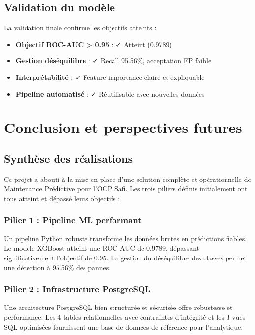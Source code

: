 \documentclass[a4paper,12pt,twoside]{report}
\begin{document}
\section{Validation du modèle}

La validation finale confirme les objectifs atteints :

\begin{itemize}
    \item \textbf{Objectif ROC-AUC > 0.95} : ✓ Atteint (0.9789)
    \item \textbf{Gestion déséquilibre} : ✓ Recall 95.56\%, acceptation FP faible
    \item \textbf{Interprétabilité} : ✓ Feature importance claire et expliquable
    \item \textbf{Pipeline automatisé} : ✓ Réutilisable avec nouvelles données
\end{itemize}

\chapter{Conclusion et perspectives futures}

\section{Synthèse des réalisations}

Ce projet a abouti à la mise en place d'une solution complète et opérationnelle de Maintenance Prédictive pour l'OCP Safi. Les trois piliers définis initialement ont tous atteint et dépassé leurs objectifs :

\subsection{Pilier 1 : Pipeline ML performant}

Un pipeline Python robuste transforme les données brutes en prédictions fiables. Le modèle XGBoost atteint une ROC-AUC de 0.9789, dépassant significativement l'objectif de 0.95. La gestion du déséquilibre des classes permet une détection à 95.56\% des pannes.

\subsection{Pilier 2 : Infrastructure PostgreSQL}

Une architecture PostgreSQL bien structurée et sécurisée offre robustesse et performance. Les 4 tables relationnelles avec contraintes d'intégrité et les 3 vues SQL optimisées fournissent une base de données de référence pour l'analytique.
\end{document}
